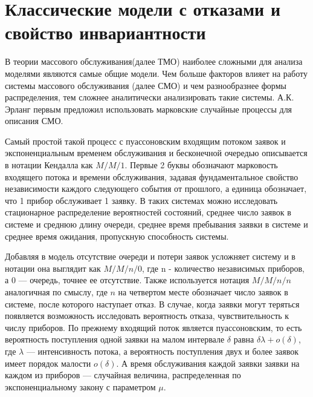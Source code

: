 \label{ch:lit_review}



\section{Классические модели с отказами и свойство инвариантности}
\label{sec:insensitivity_general}

В теории массового обслуживания(далее ТМО) наиболее сложными для анализа моделями являются самые общие модели. Чем больше факторов влияет на работу системы массового обслуживания (далее СМО) и чем разнообразнее формы распределения, тем сложнее аналитически анализировать такие системы. А.К. Эрланг первым предложил использовать марковские случайные процессы для описания СМО\cite{bocharov_pechinkin_tmo,adan_resing2015_queueing_systems}. 

Самый простой такой процесс с пуассоновским входящим потоком заявок и экспоненциальным временем обслуживания и бесконечной очередью описывается в нотации Кендалла как $M/M/1$\cite{bocharov_pechinkin_tmo,adan_resing2015_queueing_systems}. Первые 2 буквы обозначают марковость входящего потока и времени обслуживания, задавая фундаментальное свойство независимости каждого следующего события от прошлого, а единица обозначает, что 1 прибор обслуживает 1 заявку. В таких системах можно исследовать стационарное распределение вероятностей состояний, среднее число заявок в системе и среднюю длину очереди, среднее время пребывания заявки в системе и среднее время ожидания, пропускную способность системы. 

Добавляя в модель отсутствие очереди и потери заявок усложняет систему и в нотации она выглядит как $M/M/n/0$\cite{bocharov_pechinkin_tmo,adan_resing2015_queueing_systems}, где n - количество независимых приборов, а 0 --- очередь, точнее ее отсутствие. Также используется нотация $M/M/n/n$ аналогичная по смыслу, где $n$ на четвертом месте обозначает число заявок в системе, после которого наступает отказ. В случае, когда заявки могут теряться появляется возможность исследовать вероятность отказа, чувствительность к числу приборов. По прежнему входящий поток является пуассоновским, то есть вероятность поступления одной заявки на малом интервале $\delta$ равна $\delta\lambda + o(\delta)$, где $\lambda$ --- интенсивность потока, а вероятность поступления двух и более заявок имеет порядок малости $o(\delta)$. А время обслуживания каждой заявки заявки на каждом из приборов --- случайная величина, распределенная по экспоненциальному закону с параметром $\mu$. 

